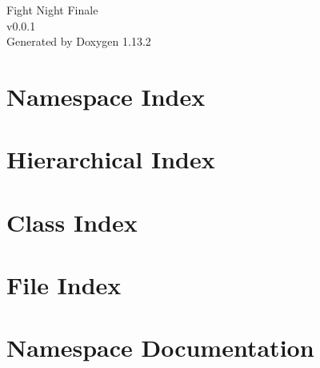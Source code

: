 \documentclass[twoside]{book}
\newcommand{\+}{\discretionary{\mbox{\scriptsize$\hookleftarrow$}}{}{}}
\newcommand{\clearemptydoublepage}{%
    \newpage{\pagestyle{empty}\cleardoublepage}%
  }
\begin{document}
  \raggedbottom
    \hypersetup{pageanchor=false,
                bookmarksnumbered=true,
                pdfencoding=unicode
               }
  \begin{titlepage}
  \vspace*{7cm}
  \begin{center}%
  {\Large Fight Night Finale}\\
  [1ex]\large v0.\+0.\+1 \\
  \vspace*{1cm}
  {\large Generated by Doxygen 1.13.2}\\
  \end{center}
  \end{titlepage}
  \clearemptydoublepage
  \tableofcontents
  \clearemptydoublepage
  \hypersetup{pageanchor=true}

\chapter{Namespace Index}

\chapter{Hierarchical Index}

\chapter{Class Index}

\chapter{File Index}

\chapter{Namespace Documentation}

\end{document}
